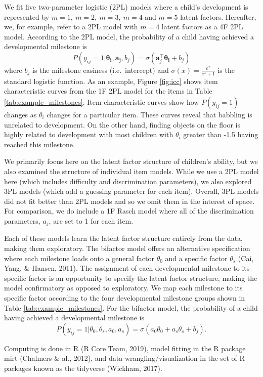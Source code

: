 \documentclass[10pt, letterpaper]{article}
\begin{document}
We fit five two-parameter logistic (2PL) models where a child's
development is represented by \(m = 1, \ m = 2, \ m = 3, \ m = 4\) and
\(m = 5\) latent factors. Hereafter, we, for example, refer to a 2PL
model with \(m = 4\) latent factors as a 4F 2PL model. According to the
2PL model, the probability of a child having achieved a developmental
milestone is \[
P(y_{ij} = 1 | \boldsymbol{\theta_i}, \boldsymbol{a_j}, b_j) = \sigma(\boldsymbol{a}_{j}^{\top}\boldsymbol{\theta_i} + b_j)
\] where \(b_j\) is the milestone easiness (i.e.~intercept) and
\(\sigma(x) = \frac{e^x}{e^x + 1}\) is the standard logistic function.
As an example, Figure \ref{fig:icc} shows item characteristic curves
from the 1F 2PL model for the items in Table
\ref{tab:example_milestones}. Item characteristic curves show how
\(P(y_{ij} = 1)\) changes as \(\theta_i\) changes for a particular item.
These curves reveal that babbling is unrelated to development. On the
other hand, finding objects on the floor is highly related to
development with most children with \(\theta_i\) greater than -1.5
having reached this milestone.

We primarily focus here on the latent factor structure of children's
ability, but we also examined the structure of individual item models.
While we use a 2PL model here (which includes difficulty and
discrimination parameters), we also explored 3PL models (which add a
guessing parameter for each item). Overall, 3PL models did not fit
better than 2PL models and so we omit them in the interest of space. For
comparison, we do include a 1F Rasch model where all of the
discrimination parameters, \(a_j\), are set to 1 for each item.

Each of these models learn the latent factor structure entirely from the
data, making them exploratory. The bifactor model offers an alternative
specification where each milestone loads onto a general factor
\(\theta_0\) and a specific factor \(\theta_s\) (Cai, Yang, \& Hansen,
2011). The assignment of each developmental milestone to its specific
factor is an opportunity to specify the latent factor structure, making
the model confirmatory as opposed to exploratory. We map each milestone
to its specific factor according to the four developmental milestone
groups shown in Table \ref{tab:example_milestones}. For the bifactor
model, the probability of a child having achieved a developmental
milestone is \[
P(y_{ij} = 1 | \theta_0, \theta_s, a_0, a_s) = \sigma(a_0\theta_0 + a_s\theta_s + b_j).
\]

Computing is done in R (R Core Team, 2019), model fitting in the R
package mirt (Chalmers \& al., 2012), and data wrangling/visualization
in the set of R packages known as the tidyverse (Wickham, 2017).
\end{document}
